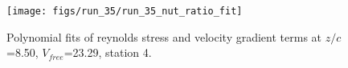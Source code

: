 \begin{figure}[H]
\centering
\texttt{[image: figs/run\_35/run\_35\_nut\_ratio\_fit]}
\caption{Polynomial fits of reynolds stress and velocity gradient terms at $z/c$=8.50, $V_{free}$=23.29, station 4.}
\label{fig:run_35_nut_ratio_fit}
\end{figure}


